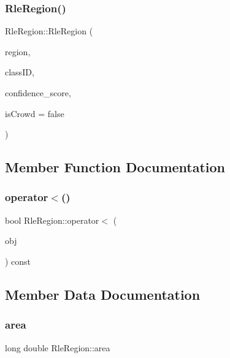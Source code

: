 \subsubsection{\texorpdfstring{Rle\+Region()}{RleRegion()}\hspace{0.1cm}{\footnotesize\ttfamily [3/3]}}
{\footnotesize\ttfamily Rle\+Region\+::\+Rle\+Region (\begin{DoxyParamCaption}\item[{const \hyperlink{struct_r_l_e}{R\+LE}}]{region,  }\item[{std\+::string}]{class\+ID,  }\item[{double}]{confidence\+\_\+score,  }\item[{bool}]{is\+Crowd = {\ttfamily false} }\end{DoxyParamCaption})\hspace{0.3cm}{\ttfamily [inline]}}



\subsection{Member Function Documentation}
\mbox{\label{struct_rle_region_af24e246b40408800d257b6b932086a97}} 
\subsubsection{\texorpdfstring{operator$<$()}{operator<()}}
{\footnotesize\ttfamily bool Rle\+Region\+::operator$<$ (\begin{DoxyParamCaption}\item[{const \hyperlink{struct_rle_region}{Rle\+Region} \&}]{obj }\end{DoxyParamCaption}) const\hspace{0.3cm}{\ttfamily [inline]}}



\subsection{Member Data Documentation}
\mbox{\label{struct_rle_region_a19f1b1dd0526f245690365dff403d984}} 
\subsubsection{\texorpdfstring{area}{area}}
{\footnotesize\ttfamily long double Rle\+Region\+::area}

